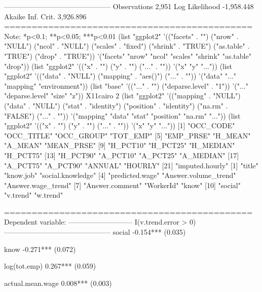 ---------------------------------------------
Observations                 2,951           
Log Likelihood            -1,958.448         
Akaike Inf. Crit.          3,926.896         
=============================================
Note:             *p<0.1; **p<0.05; ***p<0.01
(list "ggplot2" '(("facets" . "") ("nrow" . "NULL") ("ncol" . "NULL") ("scales" . "fixed") ("shrink" . "TRUE") ("as.table" . "TRUE") ("drop" . "TRUE")) '("facets" "nrow" "ncol" "scales" "shrink" "as.table" "drop"))
(list "ggplot2" '(("x" . "") ("y" . "") ("..." . "")) '("x" "y" "..."))
(list "ggplot2" '(("data" . "NULL") ("mapping" . "aes()") ("..." . "")) '("data" "..." "mapping" "environment"))
(list "base" '(("..." . "") ("deparse.level" . "1")) '("..." "deparse.level" "size" "z"))
X11cairo 
       2 
(list "ggplot2" '(("mapping" . "NULL") ("data" . "NULL") ("stat" . "identity") ("position" . "identity") ("na.rm" . "FALSE") ("..." . "")) '("mapping" "data" "stat" "position" "na.rm" "..."))
(list "ggplot2" '(("x" . "") ("y" . "") ("..." . "")) '("x" "y" "..."))
 [1] "OCC_CODE"       "OCC_TITLE"      "OCC_GROUP"      "TOT_EMP"       
 [5] "EMP_PRSE"       "H_MEAN"         "A_MEAN"         "MEAN_PRSE"     
 [9] "H_PCT10"        "H_PCT25"        "H_MEDIAN"       "H_PCT75"       
[13] "H_PCT90"        "A_PCT10"        "A_PCT25"        "A_MEDIAN"      
[17] "A_PCT75"        "A_PCT90"        "ANNUAL"         "HOURLY"        
[21] "imputed.hourly"
 [1] "title"               "know.job"            "social.knowledge"   
 [4] "predicted.wage"      "Answer.volume_trend" "Answer.wage_trend"  
 [7] "Answer.comment"      "WorkerId"            "know"               
[10] "social"              "v.trend"             "w.trend"            

=============================================
                      Dependent variable:    
                  ---------------------------
                     I(v.trend.error > 0)    
---------------------------------------------
social                     -0.154***         
                            (0.035)          
                                             
know                       -0.271***         
                            (0.072)          
                                             
log(tot.emp)               0.267***          
                            (0.059)          
                                             
actual.mean.wage           0.008***          
                            (0.003)          
                                             

